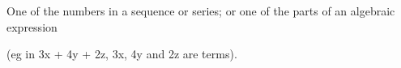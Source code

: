 One of the numbers in a sequence or series;
or one of the parts of an algebraic expression 
\par
(eg in 3x + 4y + 2z, 3x, 4y and 2z are terms).